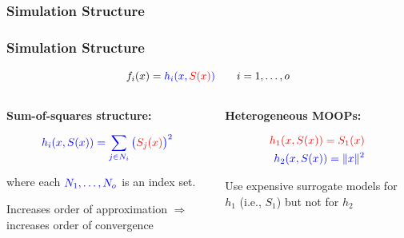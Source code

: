 \documentclass[aspectratio=169]{beamer}
\begin{document}
\begin{frame}\frametitle{Simulation Structure}
\begin{center}

\vskip -2in

\end{center}
\end{frame}

\begin{frame}\frametitle{Simulation Structure}
\pause
{\Large
$$
f_i(x) = {\color{blue}h_i(x, {\color{red}S(x)} )}
\qquad i = 1, \ldots, o
$$
}
\begin{columns}
\begin{column}{0.5\textwidth}
\pause
\textbf{Sum-of-squares structure:}

\medskip

{\large
$$
{\color{blue} h_i(x, S(x)) = \sum_{j \in N_i} \big({\color{red}S_j(x)}\big)^2}
$$

where each ${\color{blue} N_1, \ldots, N_o}$ is an index set.
}

\bigskip

Increases order of approximation $\Rightarrow$
increases order of convergence

\end{column}
\begin{column}{0.5\textwidth}
\pause
\textbf{Heterogeneous MOOPs:}

{\large
\begin{align*}
{\color{red} h_1(x, S(x)) = S_1(x)}\\
{\color{blue} h_2(x, S(x)) = \|x \|^2}
\end{align*}
}

Use expensive surrogate models for {\color{red} $h_1$} (i.e.,
{\color{red} $S_1$}) but not for {\color{blue} $h_2$}

\end{column}
\end{columns}
\end{frame}
\end{document}
